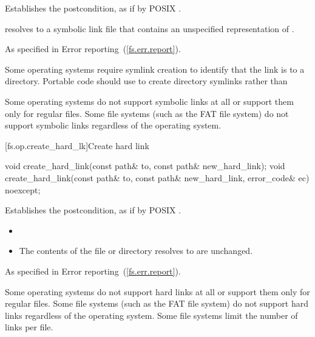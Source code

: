 \begin{itemdescr}
\pnum
\effects Establishes the postcondition, as if by POSIX .

\pnum
\postcondition {} resolves to a symbolic link file that
  contains an unspecified representation of .

\pnum
\throws As specified in Error reporting~(\ref{fs.err.report}).

\pnum
\begin{note} Some operating systems require symlink creation to
  identify that the link is to a directory. Portable code should use  to create directory symlinks rather than  \end{note}

\pnum
\begin{note} Some operating systems do not support symbolic links at all or support
  them only for regular files.
  Some file systems (such as the FAT file system) do not
  support
  symbolic links regardless of the operating system. \end{note}
\end{itemdescr}

[fs.op.create_hard_lk]{Create hard link}

%
\begin{itemdecl}
void create_hard_link(const path& to, const path& new_hard_link);
void create_hard_link(const path& to, const path& new_hard_link,
                                      error_code& ec) noexcept;
\end{itemdecl}

\begin{itemdescr}
\pnum
\effects Establishes the postcondition, as if by POSIX .

\pnum
\postcondition
\begin{itemize}
\item {}
\item The contents of the file or directory
     resolves to are unchanged.
\end{itemize}

\pnum
\throws As specified in Error reporting~(\ref{fs.err.report}).

\pnum
\begin{note} Some operating systems do not support hard links at all or support
  them only for regular files. Some file systems (such as the FAT file system)
  do not support hard links regardless of the operating system.
  Some file systems limit the number of links per file. \end{note}
\end{itemdescr}

